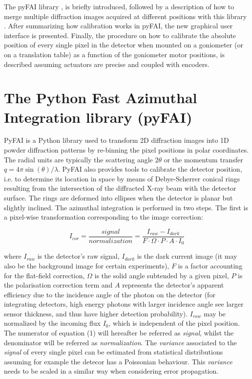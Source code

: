 \documentclass[preprint]{iucr}              %
\begin{document}
The pyFAI library \cite{fv5028}, is briefly introduced, followed by a description of
how to merge multiple diffraction images acquired at different positions with this
library \cite{PyFAI_PDJ}. 
After summarizing how calibration works in pyFAI, the new graphical user
interface is presented.
Finally, the procedure on how to calibrate the absolute position of
every single pixel in the detector when mounted on a goniometer (or on a
translation table) as a function of the goniometer motor positions, is
described assuming actuators are precise and coupled with encoders. 

\section{The Python Fast Azimuthal Integration library (pyFAI)}

PyFAI is a Python \cite{python} library used to transform 2D diffraction images into
1D powder diffraction patterns by re-binning the pixel positions in polar
coordinates. 
The radial units are typically the scattering angle  
$2\theta$ or the momentum transfer $q=4\pi \sin(\theta)/\lambda$.
PyFAI also provides tools to calibrate the detector position, i.e.
to determine its location in space by means of Debye-Scherrer conical rings
resulting from the intersection of the diffracted X-ray beam with the
detector surface. 
The rings are deformed into ellipses when the detector is planar but 
slightly inclined. 
The azimuthal integration is performed in two steps. 
The first is a pixel-wise
transformation corresponding to the image correction:

\begin{equation}
I_{cor} = \frac{signal}{normalization}  = \frac{I_{raw} - I_{dark}}{F \cdot
\Omega \cdot P \cdot A \cdot I_0} 
\end{equation}

where $I_{raw}$ is the detector's raw signal, $I_{dark}$ is the dark current
image (it may also be the background image for certain experiments), $F$ is a 
factor accounting for the flat-field correction, $\Omega$ is the solid
angle subtended by a given pixel, $P$ is the polarisation correction term and
$A$ represents the detector's apparent efficiency due to the incidence angle of the
photon on the detector (for integrating detectors, high energy photons with
larger incidence angle see larger sensor thickness, and thus have higher
detection probability).
$I_{raw}$ may be normalized by the incoming flux $I_0$, which is
independent of the pixel position.
The numerator of equation (1) will hereafter be referred as
\textit{signal}, whilst the denominator will be referred as
\textit{normalization}. 
The \textit{variance} associated to the \textit{signal} of every single pixel can be estimated 
from statistical distributions assuming for example the detecor has a Poissonian behaviour. 
This \textit{variance} needs to be scaled in a similar way when considering error propagation.
\end{document}
